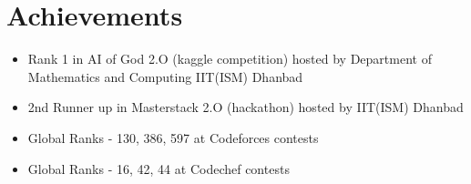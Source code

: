 \section{Achievements}
\begin{itemize}[noitemsep,nolistsep] %
    \item Rank 1 in AI of God 2.O (kaggle competition) hosted by Department of Mathematics and Computing IIT(ISM) Dhanbad
    \item 2nd Runner up in Masterstack 2.O (hackathon) hosted by IIT(ISM) Dhanbad
    \item Global Ranks - 130, 386, 597 at Codeforces contests
    \item Global Ranks - 16, 42, 44 at Codechef contests
\end{itemize} %
